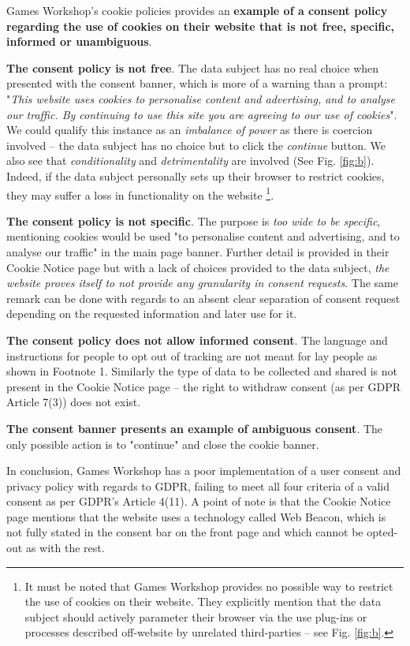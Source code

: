 \documentclass[twocolumn, letterpaper]{scrartcl}
\begin{document}
	    Games Workshop's cookie policies provides an \textbf{example of a consent policy regarding the use of cookies on their website that is not free, specific, informed or unambiguous}.
	
    	\textbf{The consent policy is not free}. The data subject has no real choice when presented with the consent banner, which is more of a warning than a prompt: "\textit{This website uses cookies to personalise content and advertising, and to analyse our traffic. By continuing to use this site you are agreeing to our use of cookies}". We could qualify this instance as an \textit{imbalance of power} as there is coercion involved -- the data subject has no choice but to click the \textit{continue} button. We also see that \textit{conditionality} and \textit{detrimentality} are involved (See Fig. \ref{fig:b}). Indeed, if the data subject personally sets up their browser to restrict cookies, they may suffer a loss in functionality on the website \footnote{It must be noted that Games Workshop provides no possible way to restrict the use of cookies on their website. They explicitly mention that the data subject should actively parameter their browser via the use plug-ins or processes described off-website by unrelated third-parties -- see Fig. \ref{fig:b}.}.
    	
    	\textbf{The consent policy is not specific}. The purpose is \textit{too wide to be specific}, mentioning cookies would be used "to personalise content and advertising, and to analyse our traffic" in the main page banner. Further detail is provided in their Cookie Notice page\cite{GW_CN} but with a lack of choices provided to the data subject, \textit{the website proves itself to not provide any granularity in consent requests}. The same remark can be done with regards to an absent clear separation of consent request depending on the requested information and later use for it. 
    	
    	\textbf{The consent policy does not allow informed consent}. The language and instructions for people to opt out of tracking are not meant for lay people as shown in Footnote 1. Similarly the type of data to be collected and shared is not present in the Cookie Notice page -- the right to withdraw consent (as per GDPR Article 7(3)) does not exist.
    	
    	\textbf{The consent banner presents an example of ambiguous consent}. The only possible action is to "continue" and close the cookie banner.
    	
    	In conclusion, Games Workshop has a poor implementation of a user consent and privacy policy with regards to GDPR, failing to meet all four criteria of a valid consent as per GDPR's Article 4(11). A point of note is that the Cookie Notice page mentions that the website uses a technology called Web Beacon, which is not fully stated in the consent bar on the front page and which cannot be opted-out as with the rest.
 	
\end{document}
